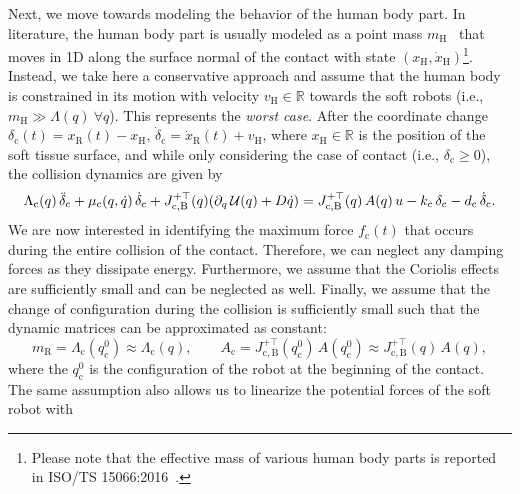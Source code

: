 Next, we move towards modeling the behavior of the human body part. In literature, the human body part is usually modeled as a point mass $m_\mathrm{H}$~\citep{haddadin2011safe, iso2016collaborative} that moves in 1D along the surface normal of the contact with state $(x_\mathrm{H},\dot{x}_\mathrm{H})$\footnote{Please note that the effective mass of various human body parts is reported in ISO/TS 15066:2016~\citep{iso2016collaborative}.}. Instead, we take here a conservative approach and assume that the human body is constrained in its motion with velocity $v_\mathrm{H} \in \mathbb{R}$ towards the soft robots (i.e., $m_\mathrm{H} \gg \Lambda(q) \: \forall q$). This represents the \emph{worst case}.
After the coordinate change $\delta_\mathrm{c}(t) = x_\mathrm{R}(t) - x_\mathrm{H}$, $\dot{\delta}_\mathrm{c} = \dot{x}_\mathrm{R}(t) + v_\mathrm{H}$, %
where $x_\mathrm{H} \in \mathbb{R}$ is the position of the soft tissue surface, and while only considering the case of contact (i.e., $\delta_\mathrm{c} \geq 0$), the collision dynamics are given by
\begin{equation}
    \Lambda_\mathrm{c}(q) \, \Ddot{\delta}_\mathrm{c} + \mu_\mathrm{c}(q,\dot{q}) \, \dot{\delta}_\mathrm{c} + J_\mathrm{c,B}^{+\top}(q) ( \partial_{q} \, \mathcal{U}(q) + D \dot{q} ) = J_\mathrm{c,B}^{+\top}(q) \, A(q) \, u - k_\mathrm{c} \, \delta_\mathrm{c} - d_\mathrm{c} \, \dot{\delta}_\mathrm{c}.
\end{equation}
We are now interested in identifying the maximum force $f_\mathrm{c}(t)$ that occurs during the entire collision of the contact.
Therefore, we can neglect any damping forces as they dissipate energy.
Furthermore, we assume that the Coriolis effects are sufficiently small and can be neglected as well.
Finally, we assume that the change of configuration during the collision is sufficiently small such that the dynamic matrices can be approximated as constant: 
\begin{equation}\label{eq:safetymetric:constant_reflected_inertia_and_actuation_matrix_definition}
    m_\mathrm{R} = \Lambda_\mathrm{c}(q_{\mathrm{c}}^0) \approx \Lambda_\mathrm{c}(q),
    \qquad
    A_\mathrm{c} = J_\mathrm{c,B}^{+\top}(q_{\mathrm{c}}^0) \, A(q_{\mathrm{c}}^0) \approx J_\mathrm{c,B}^{+\top}(q) \, A(q),
\end{equation}
where the $q_{\mathrm{c}}^0$ is the configuration of the robot at the beginning of the contact.
The same assumption also allows us to linearize the potential forces of the soft robot with 
